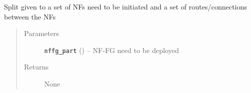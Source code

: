 \documentclass[letterpaper,10pt,english]{sphinxmanual}
\begin{document}
\begin{fulllineitems}
\begin{fulllineitems}
Split given {\hyperref[util/nffg:escape.util.nffg.NFFG]{\emph{}}} to a set of NFs need to be initiated and a set of
routes/connections between the NFs
\begin{quote}\begin{description}
\item[{Parameters}] \leavevmode
\textbf{\texttt{nffg\_part}} ({\hyperref[util/nffg:escape.util.nffg.NFFG]{\emph{}}}) -- NF-FG need to be deployed

\item[{Returns}] \leavevmode
None

\end{description}\end{quote}

\end{fulllineitems}


\end{fulllineitems}

\end{document}
